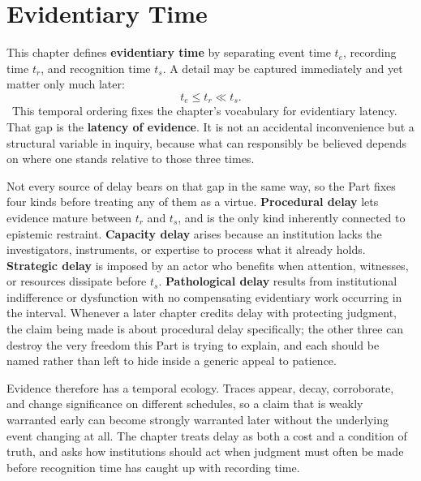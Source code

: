 
\chapter{Evidentiary Time}
\label{ch:ch017}

This chapter defines \textbf{evidentiary time} by separating event time \(t_e\), recording time \(t_r\), and recognition time \(t_s\). A detail may be captured immediately and yet matter only much later:
\[
t_e\leq t_r\ll t_s.
\]
\Definition\ This temporal ordering fixes the chapter's vocabulary for evidentiary latency.
That gap is the \textbf{latency of evidence}. It is not an accidental inconvenience but a structural variable in inquiry, because what can responsibly be believed depends on where one stands relative to those three times.

Not every source of delay bears on that gap in the same way, so the Part fixes four kinds before treating any of them as a virtue. \textbf{Procedural delay} lets evidence mature between \(t_r\) and \(t_s\), and is the only kind inherently connected to epistemic restraint. \textbf{Capacity delay} arises because an institution lacks the investigators, instruments, or expertise to process what it already holds. \textbf{Strategic delay} is imposed by an actor who benefits when attention, witnesses, or resources dissipate before \(t_s\). \textbf{Pathological delay} results from institutional indifference or dysfunction with no compensating evidentiary work occurring in the interval. Whenever a later chapter credits delay with protecting judgment, the claim being made is about procedural delay specifically; the other three can destroy the very freedom this Part is trying to explain, and each should be named rather than left to hide inside a generic appeal to patience.

Evidence therefore has a temporal ecology. Traces appear, decay, corroborate, and change significance on different schedules, so a claim that is weakly warranted early can become strongly warranted later without the underlying event changing at all. The chapter treats delay as both a cost and a condition of truth, and asks how institutions should act when judgment must often be made before recognition time has caught up with recording time.
